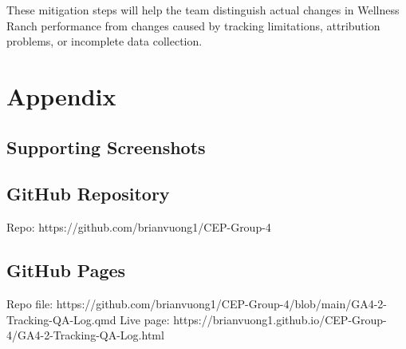 \documentclass[
  letterpaper,
  DIV=11,
  numbers=noendperiod]{scrartcl}
\begin{document}
These mitigation steps will help the team distinguish actual changes in
Wellness Ranch performance from changes caused by tracking limitations,
attribution problems, or incomplete data collection.

\section{Appendix}\label{appendix}

\subsection{Supporting Screenshots}\label{supporting-screenshots}

\subsection{GitHub Repository}\label{github-repository}

Repo: https://github.com/brianvuong1/CEP-Group-4

\subsection{GitHub Pages}\label{github-pages}

Repo file:
https://github.com/brianvuong1/CEP-Group-4/blob/main/GA4-2-Tracking-QA-Log.qmd
Live page:
https://brianvuong1.github.io/CEP-Group-4/GA4-2-Tracking-QA-Log.html
\end{document}
